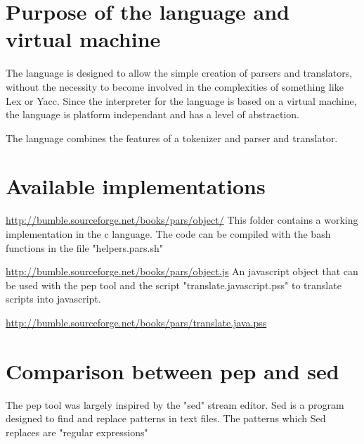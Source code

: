 \documentclass[a4paper,12pt]{article}
\begin{document}
\section{Purpose of the language and virtual machine}

 The language is designed to allow the simple creation of parsers and
 translators, without the necessity to become involved in the complexities of
 something like Lex or Yacc. Since the interpreter for the language is based
 on a virtual machine, the language is platform independant and has a level
 of abstraction.

 The language combines the features of a tokenizer and parser and
 translator.

\section{Available implementations}

 \url{http://bumble.sourceforge.net/books/pars/object/}
   This folder contains a working implementation in the c language.
   The code can be compiled with the bash functions in the file
   "helpers.pars.sh"
 
 \url{http://bumble.sourceforge.net/books/pars/object.js}
   An javascript object that can be used with the pep tool and
   the script "translate.javascript.pss" to translate scripts into
   javascript.

 \url{http://bumble.sourceforge.net/books/pars/translate.java.pss}
  
\section{Comparison between pep and sed}

 The pep tool was largely inspired by the "sed" stream editor. Sed is a program
 designed to find and replace patterns in text files. The patterns which Sed
 replaces are "regular expressions"
\end{document}
